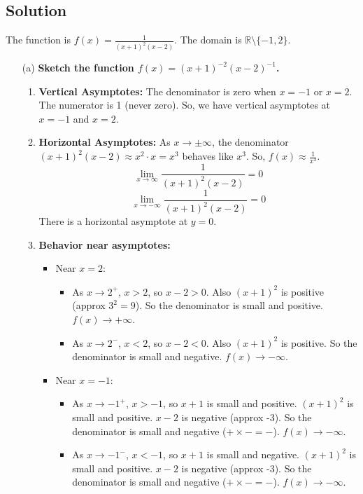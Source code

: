 \documentclass{article}
\newcommand{\R}{\mathbb{R}}
\begin{document}
\subsection*{Solution}

The function is \(f(x) = \frac{1}{(x+1)^2 (x-2)}\). The domain is \(\R \setminus \{-1, 2\}\).

\begin{enumerate}
  \item[(a)] \textbf{Sketch the function \(f(x)=(x+1)^{-2} (x-2)^{-1}\).}

    \begin{enumerate}
        \item \textbf{Vertical Asymptotes:} The denominator is zero when \(x = -1\) or \(x = 2\). The numerator is 1 (never zero). So, we have vertical asymptotes at \(x = -1\) and \(x = 2\).
        \item \textbf{Horizontal Asymptotes:} As \(x \to \pm \infty\), the denominator \((x+1)^2 (x-2) \approx x^2 \cdot x = x^3\) behaves like \(x^3\). So, \(f(x) \approx \frac{1}{x^3}\).
            \[ \lim_{x\to \infty} \frac{1}{(x+1)^2 (x-2)} = 0 \]
            \[ \lim_{x\to -\infty} \frac{1}{(x+1)^2 (x-2)} = 0 \]
            There is a horizontal asymptote at \(y = 0\).
        \item \textbf{Behavior near asymptotes:}
            \begin{itemize}
                \item Near \(x = 2\):
                    \begin{itemize}
                        \item As \(x \to 2^+\), \(x > 2\), so \(x-2 > 0\). Also \((x+1)^2\) is positive (approx \(3^2 = 9\)). So the denominator is small and positive. \(f(x) \to +\infty\).
                        \item As \(x \to 2^-\), \(x < 2\), so \(x-2 < 0\). Also \((x+1)^2\) is positive. So the denominator is small and negative. \(f(x) \to -\infty\).
                    \end{itemize}
                \item Near \(x = -1\):
                    \begin{itemize}
                        \item As \(x \to -1^+\), \(x > -1\), so \(x+1\) is small and positive. \((x+1)^2\) is small and positive. \(x-2\) is negative (approx -3). So the denominator is small and negative (\(+ \times - = -\)). \(f(x) \to -\infty\).
                        \item As \(x \to -1^-\), \(x < -1\), so \(x+1\) is small and negative. \((x+1)^2\) is small and positive. \(x-2\) is negative (approx -3). So the denominator is small and negative (\(+ \times - = -\)). \(f(x) \to -\infty\).

\end{itemize}
\end{itemize}
\end{enumerate}
\end{enumerate}
\end{document}
